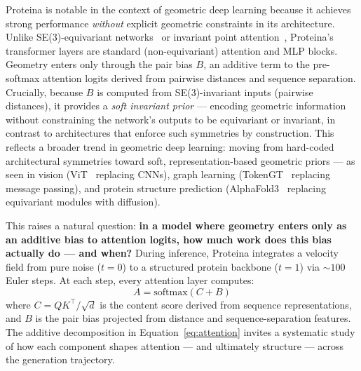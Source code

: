 \documentclass{article}
\begin{document}
Proteina is notable in the context of geometric deep learning because it achieves strong performance \emph{without} explicit geometric constraints in its architecture.
Unlike SE(3)-equivariant networks~\citep{thomas2018tensor,fuchs2020se3} or invariant point attention~\citep{jumper2021alphafold2}, Proteina's transformer layers are standard (non-equivariant) attention and MLP blocks.
Geometry enters only through the pair bias $B$, an additive term to the pre-softmax attention logits derived from pairwise distances and sequence separation.
Crucially, because $B$ is computed from SE(3)-invariant inputs (pairwise distances), it provides a \emph{soft invariant prior} --- encoding geometric information without constraining the network's outputs to be equivariant or invariant, in contrast to architectures that enforce such symmetries by construction.
This reflects a broader trend in geometric deep learning: moving from hard-coded architectural symmetries toward soft, representation-based geometric priors --- as seen in vision (ViT~\citep{dosovitskiy2021image} replacing CNNs), graph learning (TokenGT~\citep{kim2022tokengt} replacing message passing), and protein structure prediction (AlphaFold3~\citep{abramson2024alphafold3} replacing equivariant modules with diffusion).

This raises a natural question: \textbf{in a model where geometry enters only as an additive bias to attention logits, how much work does this bias actually do --- and when?}
During inference, Proteina integrates a velocity field from pure noise ($t{=}0$) to a structured protein backbone ($t{=}1$) via ${\sim}100$ Euler steps.
At each step, every attention layer computes:
\begin{equation}
    A = \mathrm{softmax}(C + B)
    \label{eq:attention}
\end{equation}
where $C = QK^\top / \sqrt{d}$ is the content score derived from sequence representations, and $B$ is the pair bias projected from distance and sequence-separation features.
The additive decomposition in Equation~\ref{eq:attention} invites a systematic study of how each component shapes attention --- and ultimately structure --- across the generation trajectory.
\end{document}
